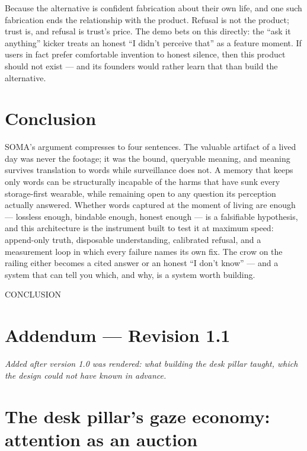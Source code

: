 Because the alternative is confident fabrication about their own life, and one such fabrication ends the relationship with the product. Refusal is not the product; trust is, and refusal is trust's price. The demo bets on this directly: the ``ask it anything'' kicker treats an honest ``I didn't perceive that'' as a feature moment. If users in fact prefer comfortable invention to honest silence, then this product should not exist --- and its founders would rather learn that than build the alternative.

\chapter{Conclusion}\label{conclusion}

SOMA's argument compresses to four sentences. The valuable artifact of a lived day was never the footage; it was the bound, queryable meaning, and meaning survives translation to words while surveillance does not. A memory that keeps only words can be structurally incapable of the harms that have sunk every storage-first wearable, while remaining open to any question its perception actually answered. Whether words captured at the moment of living are enough --- lossless enough, bindable enough, honest enough --- is a falsifiable hypothesis, and this architecture is the instrument built to test it at maximum speed: append-only truth, disposable understanding, calibrated refusal, and a measurement loop in which every failure names its own fix. The crow on the railing either becomes a cited answer or an honest ``I don't know'' --- and a system that can tell you which, and why, is a system worth building.

CONCLUSION

\chapter*{Addendum --- Revision 1.1}\label{addendum-revision-1.1}

\emph{Added after version 1.0 was rendered: what building the desk pillar taught, which the design could not have known in advance.}

\chapter{The desk pillar's gaze economy: attention as an auction}\label{the-desk-pillars-gaze-economy-attention-as-an-auction}

